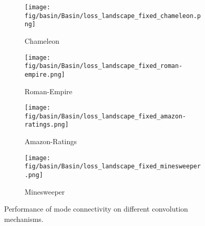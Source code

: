 \begin{figure*}[!ht]
\begin{subfigure}[b]{0.24\textwidth}
    \end{subfigure}
    \begin{subfigure}[b]{0.24\textwidth}
        \texttt{[image: fig/basin/Basin/loss\_landscape\_fixed\_chameleon.png]}
        \caption{Chameleon}
    \end{subfigure}
    \begin{subfigure}[b]{0.24\textwidth}
        \texttt{[image: fig/basin/Basin/loss\_landscape\_fixed\_roman-empire.png]}
        \caption{Roman-Empire}
    \end{subfigure}
    \begin{subfigure}[b]{0.24\textwidth}
        \texttt{[image: fig/basin/Basin/loss\_landscape\_fixed\_amazon-ratings.png]}
        \caption{Amazon-Ratings }
    \end{subfigure}
        \begin{subfigure}[b]{0.24\textwidth}
        \texttt{[image: fig/basin/Basin/loss\_landscape\_fixed\_minesweeper.png]}
        \caption{Minesweeper}
    \end{subfigure}
    \caption{Performance of mode connectivity on different convolution mechanisms.}
    \label{fig:A4}
\end{figure*}

